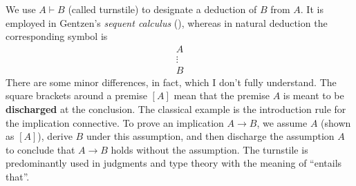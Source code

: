 \begin{notation}
We use $A \vdash B$ (called turnstile) to designate a deduction of $B$ from $A$. 
It is employed in Gentzen’s \emph{sequent calculus} (\cite{girard1989proofs}), 
whereas in natural deduction the corresponding symbol is\[
\begin{array}{c}
A \\
\vdots \\
B
\end{array}
\]
There are some minor differences, in fact, which I don't fully understand.
The square brackets around a premise $[A]$ mean that the premise $A$ is meant to 
be \textbf{discharged} at the conclusion. The classical example is the 
introduction rule for the implication connective.
To prove an implication $A \to B$, we assume $A$ 
(shown as $[A]$), derive $B$ under this assumption, and then discharge the 
assumption $A$ to conclude that $A \to B$ holds without the assumption. 
The turnstile is predominantly used in judgments and type theory with 
the meaning of ``entails that''. 
\end{notation}

